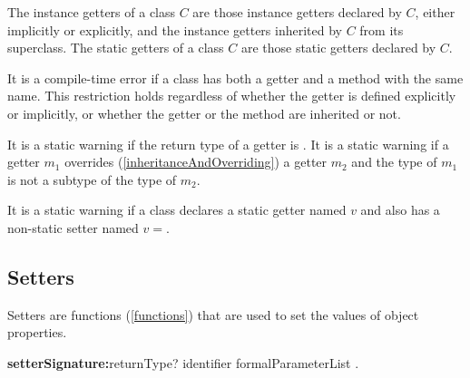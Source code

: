 \documentclass{article}
\begin{document}
\LMHash{}
The instance getters of a class $C$ are those instance getters declared by $C$, either implicitly or explicitly, and the instance getters inherited by $C$ from its superclass.
The static getters of a class $C$ are those static getters declared by $C$.

\LMHash{}
It is a compile-time error if a class has both a getter and a method with the same name.
This restriction holds regardless of whether the getter is defined explicitly or implicitly, or whether the getter or the method are inherited or not.


\LMHash{}
It is a static warning if the return type of a getter is \VOID.
It is a static warning if a getter $m_1$ overrides (\ref{inheritanceAndOverriding}) a getter
$m_2$ and the type of $m_1$ is not a subtype of the type of $m_2$.

\LMHash{}
It is a static warning if a class declares a static getter named $v$ and also has a non-static setter named $v=$.



\subsection{Setters}

\LMHash{}
Setters are functions (\ref{functions}) that are used to set the values of object properties.

\begin{grammar}
{\bf setterSignature:}returnType? \SET{} identifier formalParameterList
  .
\end{grammar}
\end{document}
